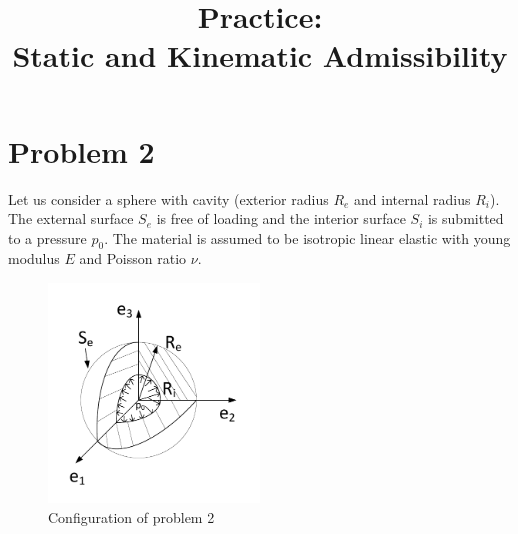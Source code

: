 \documentclass[letter,12pt]{article}
\begin{document}
\pagestyle{fancy}

\title{\textbf{Practice: \\ Static and Kinematic Admissibility}}
\date{}

\maketitle

\vspace{-1cm}


%



\section*{Problem 2}
Let us consider a sphere with cavity (exterior radius $R_e$ and internal radius $R_i$). The external surface $S_e$ is free of loading and the interior surface $S_i$ is submitted to a pressure $p_0$. The material is assumed to be isotropic linear elastic with young modulus $E$ and Poisson ratio $\nu$. \\

\begin{figure}[ht]
	\centering
	\includegraphics[width=0.5\textwidth]{figures/p2}
	\caption{Configuration of problem 2}
	\label{fig:problem2}
\end{figure}


\end{document}
